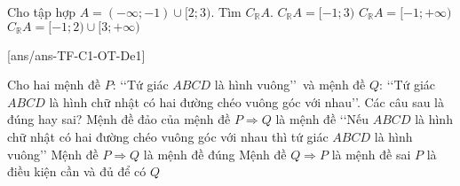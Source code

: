 \begin{ex}%
	Cho tập hợp $A=(-\infty;-1) \cup[2; 3)$. Tìm $C_\mathbb{R} A$.
	{$C_\mathbb{R} A=[-1; 3)$}
	{$C_\mathbb{R} A=[-1;+\infty)$}
	{\True$C_\mathbb{R} A=[-1; 2) \cup[3;+\infty)$}
	\loigiai{
	Ta có $C_\mathbb{R} A=[-1; 2) \cup[3;+\infty)$.
	}
\end{ex}



\TNTF
\setcounter{ex}{0}
[ans/ans-TF-C1-OT-De1]

\begin{ex}%
	Cho hai mệnh đề $P$: \lq\lq  Tứ giác $ABCD$ là hình vuông\rq\rq\ và mệnh đề $Q$: \lq\lq  Tứ giác $ABCD$ là hình chữ nhật có hai đường chéo vuông góc với nhau\rq\rq. Các câu sau là đúng hay sai?
	\choiceTF
	{\True Mệnh đề đảo của mệnh đề $P \Rightarrow Q$ là mệnh đề \lq\lq  Nếu $ABCD$ là hình chữ nhật có hai đường chéo vuông góc với nhau thì tứ giác $ABCD$ là hình vuông\rq\rq}
	{\True Mệnh đề $P \Rightarrow Q$ là mệnh đề đúng}
	{Mệnh đề $Q \Rightarrow P$ là mệnh đề sai}
	{\True $P$ là điều kiện cần và đủ để có $Q$}
\end{ex}

